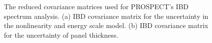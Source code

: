 \begin{figure}[h!]
\centering
{} \quad
{} \quad
\caption[Reduced covariance matrices]{The reduced covariance matrices used for PROSPECT's IBD spectrum analysis. (a) IBD covariance matrix for the uncertainty in the nonlinearity and energy scale model.
(b) IBD covariance matrix for the uncertainty of panel thickness.}
\label{fig:cov}
\end{figure}


